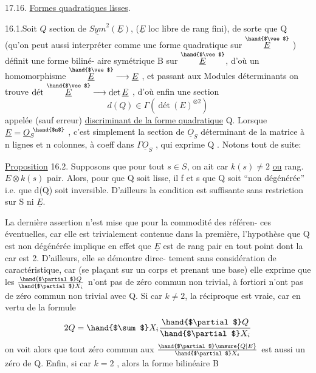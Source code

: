   

17.16. \uline{Formes quadratiques lisses}.

16.1.Soit $Q$  section de $\underline{Sym}^2(\underline{E})$, ($\underline{E}$ loc libre de rang fini),
de sorte que Q  (qu'on peut aussi interpréter comme une forme
quadratique sur $\overset{\hand{$\vee$}}{\underline{E}}$ )  définit une forme biliné-%
aire symétrique B sur $\overset{\hand{$\vee$}}{\underline{E}}$, d'où un homomorphisme $\overset{\hand{$\vee$}}{\underline{E}} \longrightarrow \underline{E}$ , et passant aux
Modules déterminants on trouve $\text{dét}\ \overset{\hand{$\vee$}}{\underline{E}} \longrightarrow \det \underline{E}$ , d'où enfin une section
\[ d(Q) \in \Gamma(\ \text{dét}\ (E)^{\otimes 2}) \]
appelée (sauf erreur) \uline{discriminant de la forme quadratique} Q. Lorsque
$\underline{E} = \underline{O}_S^{\ \hand{$n$}}$ , c'est simplement la section de $\underline{O}_S$ déterminant de la matrice
à n lignes et n colonnes, à coeff dans $\Gamma\underline{O}_S$ , qui exprime Q . Notons tout
de suite:

\uline{Proposition} 16.2. Supposons que pour tout $s \in S$, on ait car $k(s) \neq 2$ \uline{ou}
rang. $E\otimes k(s)$ pair. Alors, pour que Q soit lisse, il f et s que Q soit
``non dégénérée'' i.e. que d(Q) soit inversible. \hand{(}D'ailleurs la condition est
suffisante sans restriction sur S ni $\underline{E}$\hand{)}.

La dernière assertion n'est mise que pour la commodité des référen-%
ces éventuelles, car elle est trivialement contenue dans la première,
l'hypothèse que Q est non dégénérée implique en effet que $\underline{E}$ est de rang
pair en tout point dont la car est 2. D'ailleurs, elle se démontre direc-%
tement sans considération de caractéristique, car (se plaçant sur un corps
 et prenant une base) elle exprime que les $\frac{\hand{$\partial$} Q}{\hand{$\partial$} X_i}$ n'ont pas de zéro commun
non trivial, à fortiori  n'ont pas de zéro commun non trivial avec Q.
Si car $k \neq 2$, la réciproque est vraie, car en vertu de la formule
\[ 2Q = \hand{$\sum$} X_i \frac{\hand{$\partial$} Q}{\hand{$\partial$} X_i} \]
on voit alors que tout zéro commun aux $\frac{\hand{$\partial$} \unsure{Q|E}}{\hand{$\partial$} X_i}$ est aussi un zéro de Q. Enfin,
si car $k = 2$ ,  alors la forme bilinéaire B

